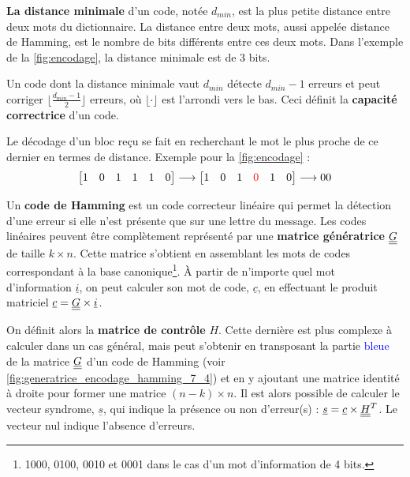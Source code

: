 \documentclass [a4paper, 11pt] {article}
\begin{document}
    \textbf{La distance minimale} d'un code, notée $d_{min}$, est la plus petite distance entre deux mots du dictionnaire. La distance entre deux mots, aussi appelée distance de Hamming, est le nombre de bits différents entre ces deux mots. Dans l'exemple de la \autoref{fig:encodage}, la distance minimale est de 3 bits.
    
    Un code dont la distance minimale vaut $d_{min}$ détecte $d_{min}-1$ erreurs et peut corriger $\lfloor\frac{d_{min}-1}{2} \rfloor$ erreurs, où $\lfloor \cdot \rfloor$ est l'arrondi vers le bas. Ceci définit la \textbf{capacité correctrice} d'un code.
    
    Le décodage d'un bloc reçu se fait en recherchant le mot le plus proche de ce dernier en termes de distance. Exemple pour la \autoref{fig:encodage} :
    \begin{equation}
        \begin{bmatrix}
            1 & 0 & 1 & 1 & 1 & 0
        \end{bmatrix}
        \longrightarrow
        \begin{bmatrix}
            1 & 0 & 1 & \color{red} 0 & 1 & 0
        \end{bmatrix}
        \longrightarrow 00
    \end{equation}
    
    Un \textbf{code de Hamming} est un code correcteur linéaire qui permet la détection d'une erreur si elle n'est présente que sur une lettre du message. Les codes linéaires peuvent être complètement représenté par une \textbf{matrice génératrice} $\underline{\underline{G}}$ de taille $k \times n$. Cette matrice s'obtient en assemblant les mots de codes correspondant à la base canonique\footnote{1000, 0100, 0010 et 0001 dans le cas d'un mot d'information de 4 bits.}. À partir de n'importe quel mot d'information $\underline{i}$, on peut calculer son mot de code, $\underline{c}$, en effectuant le produit matriciel $\underline{c} = \underline{\underline{G}} \times \underline{i}$.
    
    \pagebreak
    \pagestyle{nextpages}
    
    On définit alors la \textbf{matrice de contrôle} $H$. Cette dernière est plus complexe à calculer dans un cas général, mais peut s'obtenir en transposant la partie \textcolor{blue}{bleue} de la matrice $\underline{\underline{G}}$ d'un code de Hamming (voir \autoref{fig:generatrice_encodage_hamming_7_4}) et en y ajoutant une matrice identité à droite pour former une matrice $(n-k) \times n$. Il est alors possible de calculer le vecteur syndrome, $\underline{s}$, qui indique la présence ou non d'erreur(s) : $\underline{s} = \underline{c} \times \underline{\underline{H}}^T$. Le vecteur nul indique l'absence d'erreurs.
    
\end{document}
